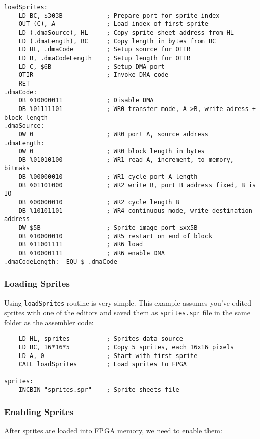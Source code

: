 \documentclass[12pt,twoside,openright,a4paper]{book}
\begin{document}
\begin{Verbatim}
loadSprites:
	LD BC, $303B            ; Prepare port for sprite index
	OUT (C), A              ; Load index of first sprite
	LD (.dmaSource), HL     ; Copy sprite sheet address from HL
	LD (.dmaLength), BC     ; Copy length in bytes from BC
	LD HL, .dmaCode         ; Setup source for OTIR
	LD B, .dmaCodeLength    ; Setup length for OTIR
	LD C, $6B               ; Setup DMA port
	OTIR                    ; Invoke DMA code
	RET
.dmaCode:
	DB %10000011            ; Disable DMA
	DB %01111101            ; WR0 transfer mode, A->B, write adress + block length
.dmaSource:
	DW 0                    ; WR0 port A, source address
.dmaLength:
	DW 0                    ; WR0 block length in bytes
	DB %01010100            ; WR1 read A, increment, to memory, bitmaks
	DB %00000010            ; WR1 cycle port A length
	DB %01101000            ; WR2 write B, port B address fixed, B is IO
	DB %00000010            ; WR2 cycle length B
	DB %10101101            ; WR4 continuous mode, write destination address
	DW $5B                  ; Sprite image port $xx5B
	DB %10000010            ; WR5 restart on end of block
	DB %11001111            ; WR6 load
	DB %10000111            ; WR6 enable DMA
.dmaCodeLength:  EQU $-.dmaCode
\end{Verbatim}


\pagebreak
\subsubsection{Loading Sprites}

Using {\tt loadSprites} routine is very simple. This example assumes you've edited sprites with one of the editors and saved them as {\tt sprites.spr} file in the same folder as the assembler code:

\begin{Verbatim}
	LD HL, sprites          ; Sprites data source
	LD BC, 16*16*5          ; Copy 5 sprites, each 16x16 pixels
	LD A, 0                 ; Start with first sprite
	CALL loadSprites        ; Load sprites to FPGA

sprites:
	INCBIN "sprites.spr"    ; Sprite sheets file
\end{Verbatim}


\subsubsection{Enabling Sprites}

After sprites are loaded into FPGA memory, we need to enable them:
\end{document}
